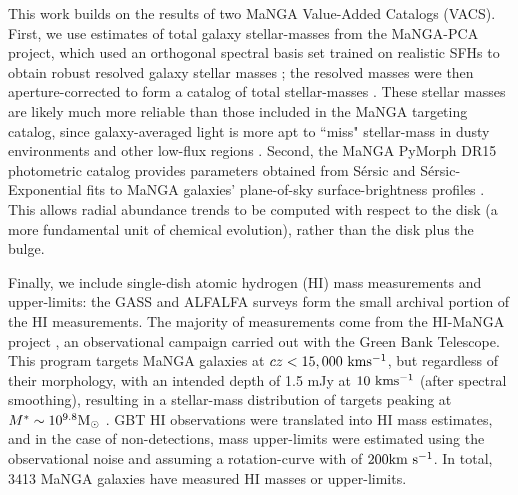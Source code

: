 This work builds on the results of two MaNGA Value-Added Catalogs (VACS). First, we use estimates of total galaxy stellar-masses from the MaNGA-PCA project, which used an orthogonal spectral basis set trained on realistic SFHs to obtain robust resolved galaxy stellar masses \citep{pace_19a_pca}; the resolved masses were then aperture-corrected to form a catalog of total stellar-masses \citep{pace_19b_pca}. These stellar masses are likely much more reliable than those included in the MaNGA targeting catalog, since galaxy-averaged light is more apt to ``miss" stellar-mass in dusty environments and other low-flux regions \citep{zibetti_2009, sorba_sawicki_15, pace_19b_pca}. Second, the MaNGA PyMorph DR15 photometric catalog provides parameters obtained from S\'{e}rsic and S\'{e}rsic-Exponential fits to MaNGA galaxies' plane-of-sky surface-brightness profiles \citep{fischer_2019_pymorph}. This allows radial abundance trends to be computed with respect to the disk (a more fundamental unit of chemical evolution), rather than the disk plus the bulge.

Finally, we include single-dish atomic hydrogen (HI) mass measurements and upper-limits: the GASS \citep{catinella_2010_GASS} and ALFALFA \citep{haynes_2018_alfalfa} surveys form the small archival portion of the HI measurements. The majority of measurements come from the HI-MaNGA project \citep{masters_19_himanga, goddy_2020_gbtcal, stark_himanga}, an observational campaign carried out with the Green Bank Telescope. This program targets MaNGA galaxies at $cz < 15,000 ~ {\rm km s^{-1}}$, but regardless of their morphology, with an intended depth of 1.5 mJy at $10 ~ {\rm km s^{-1}}$ (after spectral smoothing), resulting in a stellar-mass distribution of targets peaking at $M^* \sim 10^{9.8} {\rm M_{\odot}}$ \citep[see Figure 1 of][]{masters_19_himanga}. GBT HI observations were translated into HI mass estimates, and in the case of non-detections, mass upper-limits were estimated using the observational noise and assuming a rotation-curve with of $200 {\rm km ~ s^{-1}}$. In total, 3413 MaNGA galaxies have measured HI masses or upper-limits.